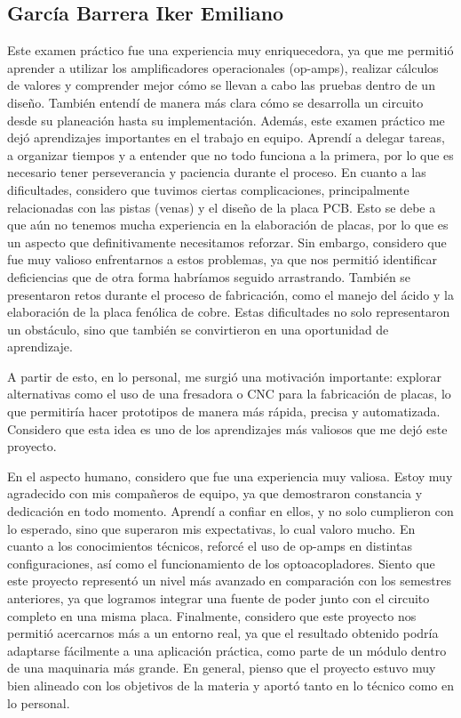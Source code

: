 \documentclass[12pt,a4paper]{article}
\begin{document}
\subsection*{García Barrera Iker Emiliano}
Este examen práctico fue una experiencia muy enriquecedora, ya que me permitió aprender a utilizar los amplificadores operacionales (op-amps), realizar cálculos de valores y comprender mejor cómo se llevan a cabo las pruebas dentro de un diseño. También entendí de manera más clara cómo se desarrolla un circuito desde su planeación hasta su implementación.
Además, este examen práctico me dejó aprendizajes importantes en el trabajo en equipo. Aprendí a delegar tareas, a organizar tiempos y a entender que no todo funciona a la primera, por lo que es necesario tener perseverancia y paciencia durante el proceso.
En cuanto a las dificultades, considero que tuvimos ciertas complicaciones, principalmente relacionadas con las pistas (venas) y el diseño de la placa PCB. Esto se debe a que aún no tenemos mucha experiencia en la elaboración de placas, por lo que es un aspecto que definitivamente necesitamos reforzar. Sin embargo, considero que fue muy valioso enfrentarnos a estos problemas, ya que nos permitió identificar deficiencias que de otra forma habríamos seguido arrastrando.
También se presentaron retos durante el proceso de fabricación, como el manejo del ácido y la elaboración de la placa fenólica de cobre. Estas dificultades no solo representaron un obstáculo, sino que también se convirtieron en una oportunidad de aprendizaje.

A partir de esto, en lo personal, me surgió una motivación importante: explorar alternativas como el uso de una fresadora o CNC para la fabricación de placas, lo que permitiría hacer prototipos de manera más rápida, precisa y automatizada. Considero que esta idea es uno de los aprendizajes más valiosos que me dejó este proyecto.


En el aspecto humano, considero que fue una experiencia muy valiosa. Estoy muy agradecido con mis compañeros de equipo, ya que demostraron constancia y dedicación en todo momento. Aprendí a confiar en ellos, y no solo cumplieron con lo esperado, sino que superaron mis expectativas, lo cual valoro mucho.
En cuanto a los conocimientos técnicos, reforcé el uso de op-amps en distintas configuraciones, así como el funcionamiento de los optoacopladores. Siento que este proyecto representó un nivel más avanzado en comparación con los semestres anteriores, ya que logramos integrar una fuente de poder junto con el circuito completo en una misma placa.
Finalmente, considero que este proyecto nos permitió acercarnos más a un entorno real, ya que el resultado obtenido podría adaptarse fácilmente a una aplicación práctica, como parte de un módulo dentro de una maquinaria más grande. En general, pienso que el proyecto estuvo muy bien alineado con los objetivos de la materia y aportó tanto en lo técnico como en lo personal.
\end{document}
